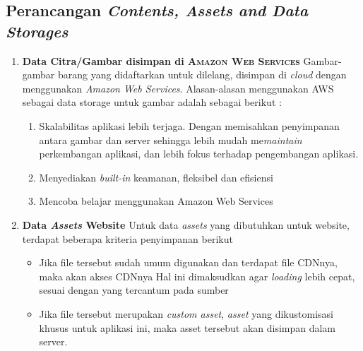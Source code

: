     
\subsection{Perancangan \textit{Contents, Assets and Data Storages}}

	\begin{enumerate}
    \item \textbf{Data Citra/Gambar disimpan di \textsc{Amazon Web Services}} \newline
    \indent Gambar-gambar barang yang didaftarkan untuk dilelang, disimpan di \textit{cloud} dengan menggunakan \textit{Amazon Web Services}. Alasan-alasan menggunakan AWS sebagai data storage untuk gambar adalah sebagai berikut :
        \begin{enumerate}[noitemsep,topsep=0pt]
        \item Skalabilitas aplikasi lebih terjaga. 
        \newline Dengan memisahkan penyimpanan antara gambar dan server sehingga lebih mudah me\textit{maintain} perkembangan aplikasi, dan lebih fokus terhadap pengembangan aplikasi.
        \item Menyediakan \textit{built-in} keamanan, fleksibel dan efisiensi \cite{wikipedia_amazon_2016}
        \item Mencoba belajar menggunakan Amazon Web Services
        \end{enumerate}
        
    \item \textbf{Data \textit{Assets} Website}
    \newline
    \indent Untuk data \textit{assets} yang dibutuhkan untuk website, terdapat beberapa kriteria penyimpanan berikut
    
      \begin{itemize}[noitemsep,topsep=0pt]
      \item Jika file tersebut sudah umum digunakan dan terdapat file CDNnya, maka akan akses CDNnya
      \newline
      Hal ini dimaksudkan agar \textit{loading} lebih cepat, sesuai dengan yang tercantum pada sumber \cite{sitepoint_7_2011}
      \item Jika file tersebut merupakan \textit{custom asset}, \textit{asset} yang dikustomisasi khusus untuk aplikasi ini, maka asset tersebut akan disimpan dalam server.
      \end{itemize}
    \end{enumerate}